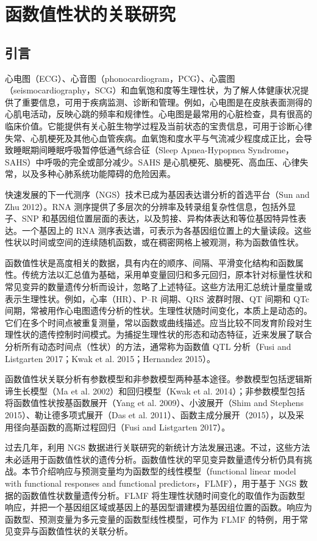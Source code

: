 \section{函数值性状的关联研究}
\subsection{引言}

心电图（ECG）、心音图（phonocardiogram，PCG）、心震图（seismocardiography，SCG）和血氧饱和度等生理性状，为了解人体健康状况提供了重要信息，可用于疾病监测、诊断和管理。例如，心电图是在皮肤表面测得的心肌电活动，反映心跳的频率和规律性。心电图是最常用的心脏检查，具有很高的临床价值。它能提供有关心脏生物学过程及当前状态的宝贵信息，可用于诊断心律失常、心肌梗死及其他心血管疾病。血氧饱和度水平与气流减少程度成正比，会导致睡眠期间睡眠呼吸暂停低通气综合征（Sleep Apnea-Hypopnea Syndrome，SAHS）中呼吸的完全或部分减少。SAHS 是心肌梗死、脑梗死、高血压、心律失常，以及多种心肺系统功能障碍的危险因素。

快速发展的下一代测序（NGS）技术已成为基因表达谱分析的首选平台（Sun and Zhu 2012）。RNA 测序提供了多层次的分辨率及转录组复杂性信息，包括外显子、SNP 和基因组位置层面的表达，以及剪接、异构体表达和等位基因特异性表达。一个基因上的 RNA 测序表达谱，可表示为各基因组位置上的大量读段。这些性状以时间或空间的连续随机函数，或在稠密网格上被观测，称为函数值性状。

函数值性状是高度相关的数据，具有内在的顺序、间隔、平滑变化结构和函数属性。传统方法以汇总值为基础，采用单变量回归和多元回归，原本针对标量性状和常见变异的数量遗传分析而设计，忽略了上述特征。这些方法用汇总统计量度量或表示生理性状。例如，心率（HR）、P--R 间期、QRS 波群时限、QT 间期和 QTc 间期，常被用作心电图遗传分析的性状。生理性状随时间变化，本质上是动态的。它们在多个时间点被重复测量，常以函数或曲线描述。应当比较不同发育阶段对生理性状的遗传控制时间模式。为捕捉生理性状的形态和动态特征，近来发展了联合分析所有动态时间点（性状）的方法，通常称为函数值 QTL 分析（Fusi and Listgarten 2017；Kwak et al. 2015；Hernandez 2015）。

函数值性状关联分析有参数模型和非参数模型两种基本途径。参数模型包括逻辑斯谛生长模型（Ma et al. 2002）和回归模型（Kwak et al. 2014）；非参数模型包括将函数值性状按基函数展开（Yang et al. 2009）、小波展开（Shim and Stephens 2015）、勒让德多项式展开（Das et al. 2011）、函数主成分展开（2015），以及采用径向基函数的高斯过程回归（Fusi and Listgarten 2017）。

过去几年，利用 NGS 数据进行关联研究的新统计方法发展迅速。不过，这些方法未必适用于函数值性状的遗传分析。函数值性状的罕见变异数量遗传分析仍具有挑战。本节介绍响应与预测变量均为函数型的线性模型（functional linear model with functional responses and functional predictors，FLMF），用于基于 NGS 数据的函数值性状数量遗传分析。FLMF 将生理性状随时间变化的取值作为函数型响应，并把一个基因组区域或基因上的基因型谱建模为基因组位置的函数。响应为函数型、预测变量为多元变量的函数型线性模型，可作为 FLMF 的特例，用于常见变异与函数值性状的关联分析。

